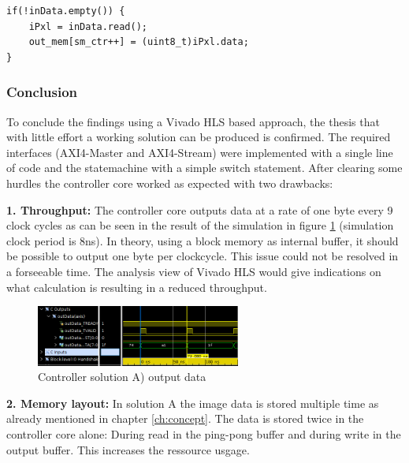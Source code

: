 \begin{minipage}{\textwidth}
\begin{lstlisting}[style=CStyle, caption=Pixel read store with query,
label=lst:runinstream2]
if(!inData.empty()) {
    iPxl = inData.read();
    out_mem[sm_ctr++] = (uint8_t)iPxl.data;
}\end{lstlisting}
\end{minipage}

\clearpage
\subsubsection*{Conclusion}
To conclude the findings using a Vivado HLS based approach, the thesis that
with little effort a working solution can be produced is confirmed. The required
interfaces (AXI4-Master and AXI4-Stream) were implemented with a single line of
code and the statemachine with a simple switch statement. After
clearing some hurdles the controller core worked as expected with two drawbacks:

\vspace{1ex}
\textbf{1. Throughput:} The controller core outputs data at a rate of one byte
every 9 clock cycles as can be seen in the result of the simulation in figure
\ref{fig:shlowhlsoutput} (simulation clock period is 8ns).
In theory, using a block memory as internal buffer, it
should be possible to output one byte per clockcycle. This issue could not be
resolved in a forseeable time. The analysis view of Vivado HLS would give
indications on what calculation is resulting in a reduced throughput.

\begin{figure}[tb!]
    \centering
    \includegraphics[width=0.6\textwidth]{images/controller/hlscontrolleroutput.png}
    \caption{Controller solution A) output data}
    \label{fig:shlowhlsoutput}
\end{figure}

\vspace{1ex}
\textbf{2. Memory layout:} In solution A the image data is stored multiple time
as already mentioned in chapter \ref{ch:concept}. The data is stored twice in
the controller core alone: During read in the ping-pong buffer and during write
in the output buffer. This increases the ressource usgage.

